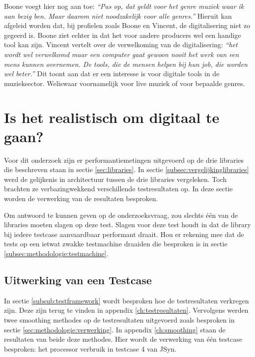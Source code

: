 Boone voegt hier nog aan toe: \textit{``Pas op, dat geldt voor het genre muziek waar ik aan bezig ben. Maar daarom niet noodzakelijk voor alle genres.''} \autocite{peterboone} Hieruit kan afgeleid worden dat, bij profielen zoals Boone en Vincent, de digitalisering niet zo gegeerd is. Boone ziet echter in dat het voor andere producers wel een handige tool kan zijn. Vincent vertelt over de verwelkoming van de digitalisering: \textit{``het wordt wel verwelkomd maar een computer gaat gewoon nooit het werk van een mens kunnen overnemen. De tools, die de mensen helpen bij hun job, die worden wel beter.''} \autocite{bartvincent} Dit toont aan dat er een interesse is voor digitale tools in de muzieksector. Weliswaar voornamelijk voor live muziek of voor bepaalde genres.

\section{Is het realistisch om digitaal te gaan?}
\label{onderzoeksvraag3}

Voor dit onderzoek zijn er performantiemetingen uitgevoerd op de drie libraries die beschreven staan in sectie \ref{sec:libraries}. In sectie \ref{subsec:vergelijkinglibraries} werd de gelijkenis in architectuur tussen de drie libraries vergeleken. Toch brachten ze verbazingwekkend verschillende testresultaten op. In deze sectie worden de verwerking van de resultaten besproken. 

Om antwoord te kunnen geven op de onderzoeksvraag, zou slechts één van de libraries moeten slagen op deze test. Slagen voor deze test houdt in dat de library bij iedere testcase aanvaardbaar performant draait. Hou er rekening mee dat de tests op een ietwat zwakke testmachine draaiden die besproken is in sectie \ref{subsec:methodologie:testmachine}.

\subsection{Uitwerking van een Testcase}
\label{calctestcase}

In sectie \ref{subsub:testframework} wordt besproken hoe de testresultaten verkregen zijn. Deze zijn terug te vinden in appendix \ref{ch:testresultaten}. Vervolgens werden twee smoothing methodes op de testresultaten uitgevoerd zoals besproken in sectie \ref{sec:methodologie:verwerking}. In appendix \ref{ch:smoothing} staan de resultaten van beide deze methodes. Hier wordt de verwerking van één testcase besproken: het processor verbruik in testcase 4 van JSyn.


